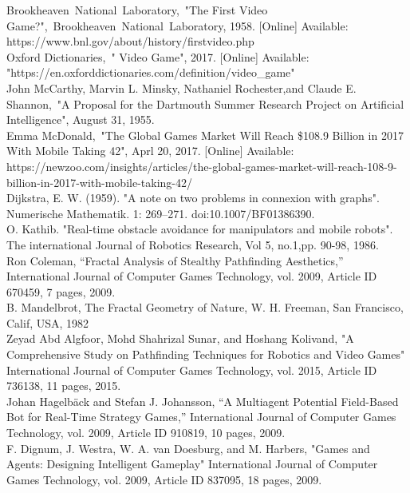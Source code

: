 \begin{thebibliography}{1}
	

	Brookheaven~National~Laboratory,~"The First Video Game?",~Brookheaven~National~Laboratory, 1958. [Online] Available: https://www.bnl.gov/about/history/firstvideo.php
\\
	Oxford Dictionaries,~" Video Game", 2017. [Online] Available: "https://en.oxforddictionaries.com/definition/video\_game"
\\

	John McCarthy, Marvin L. Minsky, Nathaniel Rochester,and Claude E. Shannon,~"A Proposal for the Dartmouth Summer Research Project on Artificial Intelligence", August 31, 1955.
\\
	Emma McDonald,~"The Global Games Market Will Reach \$108.9 Billion in 2017 With Mobile Taking 42", Aprl 20, 2017. [Online] Available: https://newzoo.com/insights/articles/the-global-games-market-will-reach-108-9-billion-in-2017-with-mobile-taking-42/
\\
	Dijkstra, E. W. (1959). "A note on two problems in connexion with graphs". Numerische Mathematik. 1: 269–271. doi:10.1007/BF01386390.
\\
 O. Kathib. "Real-time obstacle avoidance for manipulators and mobile robots". The international Journal of Robotics Research, Vol 5, no.1,pp. 90-98, 1986.
\\
Ron Coleman, “Fractal Analysis of Stealthy Pathfinding Aesthetics,” International Journal of Computer Games Technology, vol. 2009, Article ID 670459, 7 pages, 2009.
\\
B. Mandelbrot, The Fractal Geometry of Nature, W. H. Freeman, San Francisco, Calif, USA, 1982
\\
Zeyad Abd Algfoor, Mohd Shahrizal Sunar, and Hoshang Kolivand, "A Comprehensive Study on Pathfinding Techniques for Robotics and Video Games" International Journal of Computer Games Technology, vol. 2015, Article ID 736138, 11 pages, 2015.
\\
 Johan Hagelbäck and Stefan J. Johansson, “A Multiagent Potential Field-Based Bot for Real-Time Strategy Games,” International Journal of Computer Games Technology, vol. 2009, Article ID 910819, 10 pages, 2009. 
 \\ 
F. Dignum, J. Westra, W. A. van Doesburg, and M. Harbers, "Games and Agents: Designing Intelligent Gameplay" International Journal of Computer Games Technology, vol. 2009, Article ID 837095, 18 pages, 2009.
\\


\end{thebibliography}
